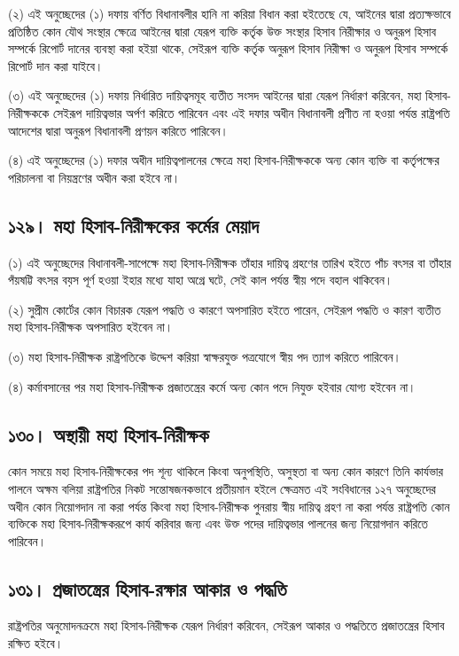 \documentclass[11pt]{article}
\begin{document}
(২) এই অনুচ্ছেদের (১) দফায় বর্ণিত বিধানাবলীর হানি না করিয়া বিধান করা
    হইতেছে যে, আইনের দ্বারা প্রত্যক্ষভাবে প্রতিষ্ঠিত কোন যৌথ সংস্থার ক্ষেত্রে
    আইনের দ্বারা যেরূপ ব্যক্তি কর্তৃক উক্ত সংস্থার হিসাব নিরীক্ষার ও অনুরূপ হিসাব
    সম্পর্কে রিপোর্ট দানের ব্যবস্থা করা হইয়া থাকে, সেইরূপ ব্যক্তি কর্তৃক অনুরূপ হিসাব
    নিরীক্ষা ও অনুরূপ হিসাব সম্পর্কে রিপোর্ট দান করা যাইবে।

(৩) এই অনুচ্ছেদের (১) দফায় নির্ধারিত দায়িত্বসমূহ ব্যতীত সংসদ আইনের দ্বারা
    যেরূপ নির্ধারণ করিবেন, মহা হিসাব-নিরীক্ষককে সেইরূপ দায়িত্বভার অর্পণ করিতে
    পারিবেন এবং এই দফার অধীন বিধানাবলী প্রণীত না হওয়া পর্যন্ত রাষ্ট্রপতি আদেশের
    দ্বারা অনুরূপ বিধানাবলী প্রণয়ন করিতে পারিবেন।

(৪) এই অনুচ্ছেদের (১) দফার অধীন দায়িত্বপালনের ক্ষেত্রে মহা হিসাব-নিরীক্ষককে
    অন্য কোন ব্যক্তি বা কর্তৃপক্ষের পরিচালনা বা নিয়ন্ত্রণের অধীন করা হইবে না।

\subsection{১২৯। মহা হিসাব-নিরীক্ষকের কর্মের মেয়াদ}
\label{sec:orgf3ea98c}
(১) এই অনুচ্ছেদের বিধানাবলী-সাপেক্ষে মহা হিসাব-নিরীক্ষক তাঁহার দায়িত্ব
    গ্রহণের তারিখ হইতে পাঁচ বৎসর বা তাঁহার পঁয়ষট্টি বৎসর বয়স পূর্ণ হওয়া ইহার মধ্যে
    যাহা অগ্রে ঘটে, সেই কাল পর্যন্ত স্বীয় পদে বহাল থাকিবেন।

(২) সুপ্রীম কোর্টের কোন বিচারক যেরূপ পদ্ধতি ও কারণে অপসারিত হইতে পারেন,
    সেইরূপ পদ্ধতি ও কারণ ব্যতীত মহা হিসাব-নিরীক্ষক অপসারিত হইবেন না।

(৩) মহা হিসাব-নিরীক্ষক রাষ্ট্রপতিকে উদ্দেশ করিয়া স্বাক্ষরযুক্ত পত্রযোগে স্বীয় পদ
    ত্যাগ করিতে পারিবেন।

(৪) কর্মাবসানের পর মহা হিসাব-নিরীক্ষক প্রজাতন্ত্রের কর্মে অন্য কোন পদে নিযুক্ত
    হইবার যোগ্য হইবেন না।

\subsection{১৩০। অস্থায়ী মহা হিসাব-নিরীক্ষক}
\label{sec:orgebad711}
কোন সময়ে মহা হিসাব-নিরীক্ষকের পদ শূন্য থাকিলে কিংবা অনুপস্থিতি, অসুস্থতা বা
অন্য কোন কারণে তিনি কার্যভার পালনে অক্ষম বলিয়া রাষ্ট্রপতির নিকট
সন্তোষজনকভাবে প্রতীয়মান হইলে ক্ষেত্রমত এই সংবিধানের ১২৭ অনুচ্ছেদের অধীন কোন
নিয়োগদান না করা পর্যন্ত কিংবা মহা হিসাব-নিরীক্ষক পুনরায় স্বীয় দায়িত্ব গ্রহণ
না করা পর্যন্ত রাষ্ট্রপতি কোন ব্যক্তিকে মহা হিসাব-নিরীক্ষকরূপে কার্য করিবার জন্য
এবং উক্ত পদের দায়িত্বভার পালনের জন্য নিয়োগদান করিতে পারিবেন।
\subsection{১৩১। প্রজাতন্ত্রের হিসাব-রক্ষার আকার ও পদ্ধতি}
\label{sec:org9dc37a5}
রাষ্ট্রপতির অনুমোদনক্রমে মহা হিসাব-নিরীক্ষক যেরূপ নির্ধারণ করিবেন, সেইরূপ আকার
ও পদ্ধতিতে প্রজাতন্ত্রের হিসাব রক্ষিত হইবে।
\end{document}
